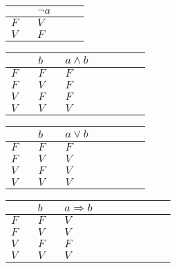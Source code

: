 \documentclass[12pt]{article}
\begin{document}
	\begin{center}
	\begin{longtable}{|>{\centering\arraybackslash}p{0.2333\linewidth}|>{\centering\arraybackslash}p{0.4666\linewidth}|}
		\hline
		{\small $a$} & {\small $\neg a$}\\ 
		\hline
		$F$ & $V$\\ 
		\hline
		$V$ & $F$\\ 
		\hline
	\end{longtable}\end{center}
	\begin{center}
	\begin{longtable}{|>{\centering\arraybackslash}p{0.1399\linewidth}|>{\centering\arraybackslash}p{0.1399\linewidth}|>{\centering\arraybackslash}p{0.4199\linewidth}|}
		\hline
		{\small $a$} & {\small $b$} & {\small $a\wedge b$}\\ 
		\hline
		$F$ & $F$ & $F$\\ 
		\hline
		$F$ & $V$ & $F$\\ 
		\hline
		$V$ & $F$ & $F$\\ 
		\hline
		$V$ & $V$ & $V$\\ 
		\hline
	\end{longtable}\end{center}
	\begin{center}
	\begin{longtable}{|>{\centering\arraybackslash}p{0.1399\linewidth}|>{\centering\arraybackslash}p{0.1399\linewidth}|>{\centering\arraybackslash}p{0.4199\linewidth}|}
		\hline
		{\small $a$} & {\small $b$} & {\small $a\vee b$}\\ 
		\hline
		$F$ & $F$ & $F$\\ 
		\hline
		$F$ & $V$ & $V$\\ 
		\hline
		$V$ & $F$ & $V$\\ 
		\hline
		$V$ & $V$ & $V$\\ 
		\hline
	\end{longtable}\end{center}
	\begin{center}
	\begin{longtable}{|>{\centering\arraybackslash}p{0.1166\linewidth}|>{\centering\arraybackslash}p{0.1166\linewidth}|>{\centering\arraybackslash}p{0.4666\linewidth}|}
		\hline
		{\small $a$} & {\small $b$} & {\small $a\Rightarrow b$}\\ 
		\hline
		$F$ & $F$ & $V$\\ 
		\hline
		$F$ & $V$ & $V$\\ 
		\hline
		$V$ & $F$ & $F$\\ 
		\hline
		$V$ & $V$ & $V$\\ 
		\hline
	\end{longtable}\end{center}
\end{document}
